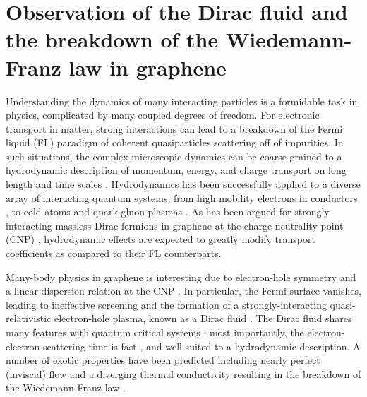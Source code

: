 \section{Observation of the Dirac fluid and the breakdown of the Wiedemann-Franz law in graphene}
Understanding the dynamics of many interacting particles is a formidable task in physics, complicated by many coupled degrees of freedom.   For electronic transport in matter, strong interactions can lead to a breakdown of the Fermi liquid (FL) paradigm of coherent quasiparticles scattering off of impurities.  In such situations, the complex microscopic dynamics can be coarse-grained to a hydrodynamic description of momentum, energy, and charge transport on long length and time scales \cite{kadanoff_hydrodynamic_1963}. Hydrodynamics has been successfully applied to a diverse array of interacting quantum systems, from high mobility electrons in conductors \cite{jong_hydrodynamic_1995}, to cold atoms \cite{cao_universal_2011} and quark-gluon plasmas \cite{shuryak_why_2004}.   As has been argued for strongly interacting massless Dirac fermions in graphene at the charge-neutrality point (CNP) \cite{muller_collective_2008, foster_slow_2009, apostolov_hydrodynamic_2014, narozhny_hydrodynamics_2015}, hydrodynamic effects are expected to greatly modify transport coefficients as compared to their FL counterparts.

Many-body physics in graphene is interesting due to electron-hole symmetry and a linear dispersion relation at the CNP \cite{novoselov_two-dimensional_2005, zhang_experimental_2005}. In particular, the Fermi surface vanishes, leading to ineffective screening \cite{siegel_charge-carrier_2013} and the formation of a strongly-interacting quasi-relativistic electron-hole plasma, known as a Dirac fluid \cite{sheehy_quantum_2007}.  The Dirac fluid shares many features with quantum critical systems \cite{keimer_quantum_2011}: most importantly, the electron-electron scattering time is fast \cite{lui_ultrafast_2010, breusing_ultrafast_2009, tielrooij_photoexcitation_2013, johannsen_direct_2013}, and well suited to a hydrodynamic description.   A number of exotic properties have been predicted including nearly perfect (inviscid) flow \cite{muller_graphene:_2009} and a diverging thermal conductivity resulting in the breakdown of the Wiedemann-Franz law \cite{muller_quantum-critical_2008,foster_slow_2009}.


